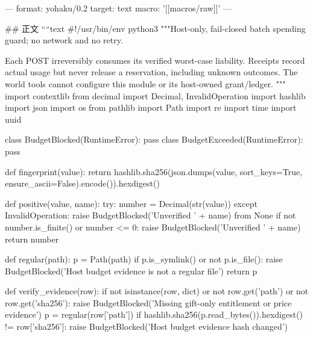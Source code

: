 ---
format: yohaku/0.2
target: text
macro: '[[macros/raw]]'
---

## 正文
````text
#!/usr/bin/env python3
"""Host-only, fail-closed batch spending guard; no network and no retry.

Each POST irreversibly consumes its verified worst-case liability. Receipts
record actual usage but never release a reservation, including unknown outcomes.
The world tools cannot configure this module or its host-owned grant/ledger.
"""
import contextlib
from decimal import Decimal, InvalidOperation
import hashlib
import json
import os
from pathlib import Path
import re
import time
import uuid

class BudgetBlocked(RuntimeError): pass
class BudgetExceeded(RuntimeError): pass

def fingerprint(value):
    return hashlib.sha256(json.dumps(value, sort_keys=True, ensure_ascii=False).encode()).hexdigest()

def positive(value, name):
    try: number = Decimal(str(value))
    except InvalidOperation: raise BudgetBlocked('Unverified ' + name) from None
    if not number.is_finite() or number <= 0: raise BudgetBlocked('Unverified ' + name)
    return number

def regular(path):
    p = Path(path)
    if p.is_symlink() or not p.is_file(): raise BudgetBlocked('Host budget evidence is not a regular file')
    return p

def verify_evidence(row):
    if not isinstance(row, dict) or not row.get('path') or not row.get('sha256'):
        raise BudgetBlocked('Missing gift-only entitlement or price evidence')
    p = regular(row['path'])
    if hashlib.sha256(p.read_bytes()).hexdigest() != row['sha256']:
        raise BudgetBlocked('Host budget evidence hash changed')

